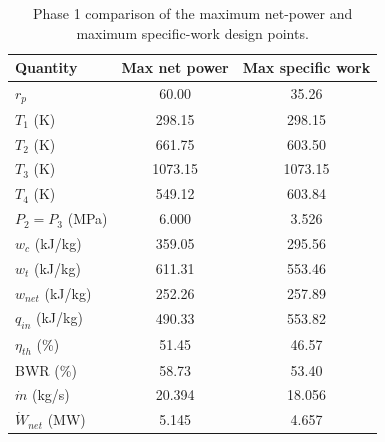 \begin{table}[htbp]
    \centering
    \caption{Phase 1 comparison of the maximum net-power and maximum specific-work design points.}
    \label{tab:phase1_design_point_comparison}
    \begin{tabular}{lcc}
        \hline
        Quantity & Max net power & Max specific work \\
        \hline
        $r_p$ & 60.00 & 35.26 \\
        $T_1$ (K) & 298.15 & 298.15 \\
        $T_2$ (K) & 661.75 & 603.50 \\
        $T_3$ (K) & 1073.15 & 1073.15 \\
        $T_4$ (K) & 549.12 & 603.84 \\
        $P_2=P_3$ (MPa) & 6.000 & 3.526 \\
        $w_c$ (kJ/kg) & 359.05 & 295.56 \\
        $w_t$ (kJ/kg) & 611.31 & 553.46 \\
        $w_{net}$ (kJ/kg) & 252.26 & 257.89 \\
        $q_{in}$ (kJ/kg) & 490.33 & 553.82 \\
        $\eta_{th}$ (\%) & 51.45 & 46.57 \\
        BWR (\%) & 58.73 & 53.40 \\
        $\dot{m}$ (kg/s) & 20.394 & 18.056 \\
        $\dot{W}_{net}$ (MW) & 5.145 & 4.657 \\
        \hline
    \end{tabular}
\end{table}